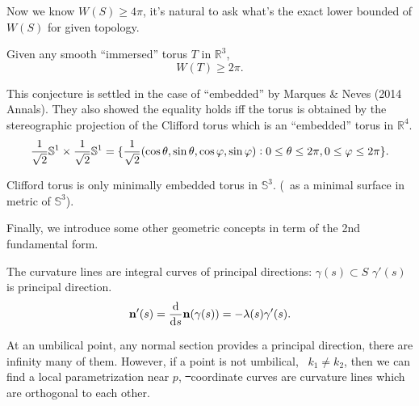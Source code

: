 Now we know \(W(S)\ge 4\pi\), it's natural to ask what's the exact lower bounded
of \(W(S)\) for given topology.

\begin{conjecture}[Willmore]
    Given any smooth ``immersed'' torus \(T\) in \(\mathbb{R}^3\), \[
        W(T)\ge 2\pi.
    \]
\end{conjecture}

This conjecture is settled in the case of ``embedded'' by Marques \& Neves (2014
Annals). They also showed the equality holds iff the torus is obtained by the
stereographic projection of the Clifford torus which is an ``embedded'' torus in
\(\mathbb{R}^4\). \[
    \frac{1}{\sqrt{2}}\mathbb{S}^1\times \frac{1}{\sqrt{2}}\mathbb{S}^1
    =\{\frac{1}{\sqrt{2}}(\cos\theta,\sin\theta,\cos\varphi,\sin\varphi):
    0\le \theta\le 2\pi,0\le \varphi\le 2\pi\}
.\] 

\begin{conjecture}
    Clifford torus is only minimally embedded torus in \(\mathbb{S}^3\).
    (\ie\ as a minimal surface in metric of \(\mathbb{S}^3\)).
\end{conjecture}

Finally, we introduce some other geometric concepts in term of the 2nd fundamental 
form.

\begin{definition}
    The curvature lines are integral curves of principal directions:
    \(\gamma(s)\subset S\) \st{} \(\gamma'(s)\) is principal direction. \ie\ \[
        \vb{n}'(s)=\dv{s}\vb{n}(\gamma(s))=-\lambda(s)\gamma'(s)
    .\] 
\end{definition}

\begin{remark}
    At an umbilical point, any normal section provides a principal direction, there
    are infinity many of them. However, if a point is not umbilical, \ie\ \(k_1\neq 
    k_2\), then we can find a local parametrization near \(p\), \st\ coordinate
    curves are curvature lines which are orthogonal to each other.
\end{remark}

